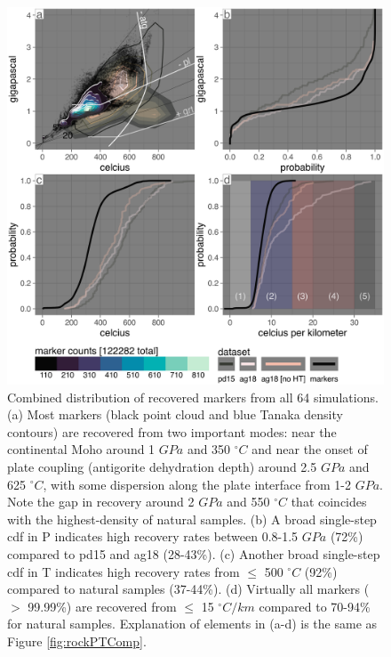 \begin{figure}[htbp]

{\centering \includegraphics[width=1\linewidth,]{assets/figs/chpt4/marx_comp} 

}

\caption[\gls{pt} distribution of recovered markers from all simulations]{Combined distribution of recovered markers from all 64 simulations. (a) Most markers (black point cloud and blue Tanaka density contours) are recovered from two important modes: near the continental Moho around 1 \(GPa\) and 350 \(^\circ C\) and near the onset of plate coupling (antigorite dehydration depth) around 2.5 \(GPa\) and 625 \(^\circ C\), with some dispersion along the plate interface from 1-2 \(GPa\). Note the gap in recovery around 2 \(GPa\) and 550 \(^\circ C\) that coincides with the highest-density of natural samples. (b) A broad single-step \gls{cdf} in P indicates high recovery rates between 0.8-1.5 \(GPa\) (72\%) compared to pd15 and ag18 (28-43\%). (c) Another broad single-step \gls{cdf} in T indicates high recovery rates from \(\leq\) 500 \(^\circ C\) (92\%) compared to natural samples (37-44\%). (d) Virtually all markers (\(>\) 99.99\%) are recovered from \(\leq\) 15 \(^\circ C/km\) compared to 70-94\% for natural samples. Explanation of elements in (a-d) is the same as Figure \ref{fig:rockPTComp}.}\label{fig:marxComp}
\end{figure}

